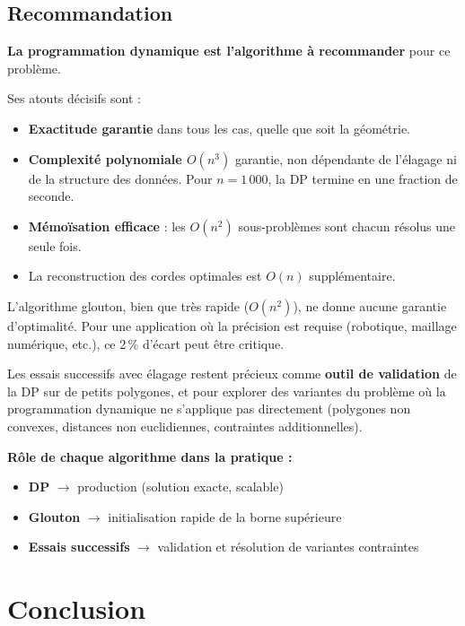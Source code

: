 \documentclass[12pt,a4paper]{article}
\begin{document}
\subsection*{Recommandation}

\textbf{La programmation dynamique est l'algorithme à recommander} pour ce problème.

Ses atouts décisifs sont :
\begin{itemize}
  \item \textbf{Exactitude garantie} dans tous les cas, quelle que soit la géométrie.
  \item \textbf{Complexité polynomiale $O(n^3)$} garantie, non dépendante de l'élagage
        ni de la structure des données. Pour $n = 1\,000$, la DP termine en une fraction
        de seconde.
  \item \textbf{Mémoïsation efficace} : les $O(n^2)$ sous-problèmes sont chacun résolus
        une seule fois.
  \item La reconstruction des cordes optimales est $O(n)$ supplémentaire.
\end{itemize}

L'algorithme glouton, bien que très rapide ($O(n^2)$), ne donne aucune garantie
d'optimalité. Pour une application où la précision est requise (robotique, maillage
numérique, etc.), ce 2\,\% d'écart peut être critique.

Les essais successifs avec élagage restent précieux comme \textbf{outil de validation} de
la DP sur de petits polygones, et pour explorer des variantes du problème où la
programmation dynamique ne s'applique pas directement (polygones non convexes, distances
non euclidiennes, contraintes additionnelles).

\textbf{Rôle de chaque algorithme dans la pratique :}
\begin{itemize}
  \item \textbf{DP} $\to$ production (solution exacte, scalable)
  \item \textbf{Glouton} $\to$ initialisation rapide de la borne supérieure
  \item \textbf{Essais successifs} $\to$ validation et résolution de variantes contraintes
\end{itemize}

\clearpage
\section{Conclusion}
\end{document}
